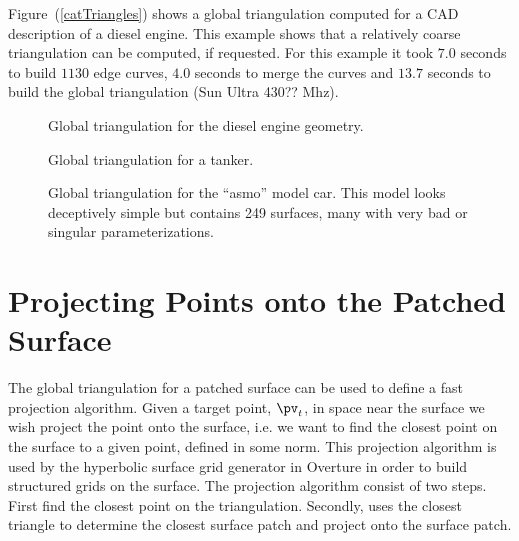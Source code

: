 \documentclass[11pt]{article}
\begin{document}
Figure~(\ref{catTriangles}) shows a global triangulation computed for a CAD description of a
diesel engine. This example shows that a relatively coarse triangulation can be computed, if requested.
For this example it took $7.0$ seconds to build $1130$ edge curves, $4.0$ seconds to merge the curves and
$13.7$ seconds to build the global triangulation (Sun Ultra 430?? Mhz).

\begin{figure}[hbt]
  \begin{center}
  \end{center}
\caption{Global triangulation for the diesel engine geometry.} \label{catTriangulation}
\end{figure}

\begin{figure}[hbt]
  \begin{center}
  \end{center}
\caption{Global triangulation for a tanker.} \label{catTriangulation}
\end{figure}

\begin{figure}[hbt]
  \begin{center}
  \end{center}
\caption{Global triangulation for the ``asmo'' model car. This model looks deceptively simple
      but contains 249 surfaces, many with very bad or singular parameterizations.} \label{amsoTriangulation}
\end{figure}




\section{Projecting Points onto the Patched Surface}


  The global triangulation for a patched surface can be used to define a
fast projection algorithm.  Given a target point, $\pv_t$, in space near the surface we
wish project the point onto the surface, i.e. we want to find the
closest point on the surface to a given point, defined in some norm. This projection algorithm
is used by the hyperbolic surface grid generator in Overture in order to
build structured grids on the surface. The projection algorithm consist of two steps.
First find the closest point on the triangulation. Secondly, uses the closest triangle to
determine the closest surface patch and project onto the surface patch.
\end{document}
